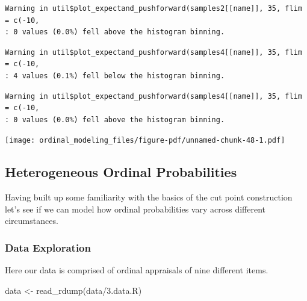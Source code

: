 \documentclass[
  letterpaper,
  DIV=11,
  numbers=noendperiod]{scrartcl}
\newenvironment{Shaded}{\begin{snugshade}}{\end{snugshade}}
\newcommand{\FunctionTok}[1]{\textcolor[rgb]{0.28,0.35,0.67}{#1}}
\newcommand{\NormalTok}[1]{\textcolor[rgb]{0.00,0.23,0.31}{#1}}
\newcommand{\OtherTok}[1]{\textcolor[rgb]{0.00,0.23,0.31}{#1}}
\newcommand{\SpecialCharTok}[1]{\textcolor[rgb]{0.37,0.37,0.37}{#1}}
\newcommand{\StringTok}[1]{\textcolor[rgb]{0.13,0.47,0.30}{#1}}
\begin{document}
\begin{verbatim}
Warning in util$plot_expectand_pushforward(samples2[[name]], 35, flim = c(-10,
: 0 values (0.0%) fell above the histogram binning.
\end{verbatim}

\begin{verbatim}
Warning in util$plot_expectand_pushforward(samples4[[name]], 35, flim = c(-10,
: 4 values (0.1%) fell below the histogram binning.
\end{verbatim}

\begin{verbatim}
Warning in util$plot_expectand_pushforward(samples4[[name]], 35, flim = c(-10,
: 0 values (0.0%) fell above the histogram binning.
\end{verbatim}

\texttt{[image: ordinal\_modeling\_files/figure-pdf/unnamed-chunk-48-1.pdf]}

\subsection{Heterogeneous Ordinal
Probabilities}\label{heterogeneous-ordinal-probabilities}

Having built up some familiarity with the basics of the cut point
construction let's see if we can model how ordinal probabilities vary
across different circumstances.

\subsubsection{Data Exploration}\label{data-exploration-2}

Here our data is comprised of ordinal appraisals of nine different
items.

\begin{Shaded}
\begin{Highlighting}[]
\NormalTok{data }\OtherTok{\textless{}{-}} \FunctionTok{read\_rdump}\NormalTok{(}\StringTok{\textquotesingle{}data/3.data.R\textquotesingle{}}\NormalTok{)}
\end{Highlighting}
\end{Shaded}

\begin{Shaded}
\end{Shaded}
\end{document}
